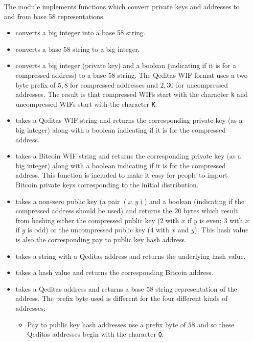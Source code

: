 The module {} implements
functions which convert private keys and addresses 
to and from base 58 representations.
\begin{itemize}
\item {} converts a big integer into a base 58 string.
\item {} converts a base 58 string to a big integer.
\item {} converts a big integer (private key) and a boolean (indicating if it is for a compressed address) to a base 58 string.
The Qeditas WIF format uses a two byte prefix of $5,8$ for compressed addresses
and $2,30$ for uncompressed addresses.
The result is that compressed WIFs start with the character {\tt{k}} and uncompressed WIFs start
with the character {\tt{K}}.
\item {} takes a Qeditas WIF string and returns the corresponding
private key (as a big integer) along with a boolean indicating if it is for the compressed address.
\item {} takes a Bitcoin WIF string and returns the corresponding
private key (as a big integer) along with a boolean indicating if it is for the compressed address.
This function is included to make it easy for people to import Bitcoin private keys corresponding to the
initial distribution.
\item {} takes a non-zero public key (a pair $(x,y)$) and a boolean (indicating if the compressed address should be used)
and returns the $20$ bytes which result from hashing
either the compressed public key ($2$ with $x$ if $y$ is even; $3$ with $x$ if $y$ is odd)
or the uncompressed public key ($4$ with $x$ and $y$).
This hash value is also the corresponding pay to public key hash address.
\item {} takes a string with a Qeditas address and returns the underlying hash value.
\item {} takes a hash value and returns the corresponding Bitcoin address.
\item {} takes a Qeditas address and returns a base 58 string representation of the address.
The prefix byte used is different for the four different kinds of addresses:
\begin{itemize}
\item Pay to public key hash addresses use a prefix byte of $58$
and so these Qeditas addresses begin with the character {\tt{Q}}.

\end{itemize}
\end{itemize}
